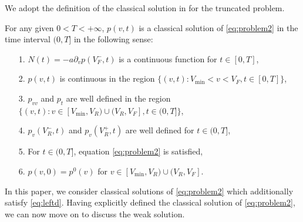  We adopt the definition of the classical solution in \cite{carrillo2013classical}\cite{liu2022rigorous} for the truncated problem.
\begin{definition} \label{class_solution}
    For any given $0<T<+\infty$, $p(v,t)$ is a classical solution of \eqref{eq:problem2} in the time interval $(0, T]$  in the following sense:
    \begin{itemize}
        \item[1.] $N(t)=-a\partial_vp(V_F^-,t)$ is a continuous function for $t\in [0,T]$,
        \item[2.] $p(v,t)$ is continuous in the region $\{(v,t):V_{\min}<v<V_F, t\in[0,T]\}$,
        \item[3.] $p_{vv}$ and $p_t$ are well defined in the region $\{(v,t): v\in [V_{\min},V_R)\cup(V_R,V_F], t \in (0,T]\}$,
        \item[4.] $p_v(V_R^-,t)$ and $p_v(V_R^+,t)$ are well defined for $t\in(0,T]$,
        \item[5.] For $t\in (0,T]$, equation \eqref{eq:problem2} is satisfied,
        \item[6.] $p(v,0)=p^0(v)$ for $v\in [V_{\min},V_R)\cup(V_R,V_F] $.
    \end{itemize}
\end{definition}
In this paper, we consider classical solutions of \eqref{eq:problem2} which additionally satisfy \eqref{eq:leftd}. Having explicitly defined the classical solution of \eqref{eq:problem2}, we can now move on to discuss the weak solution.


